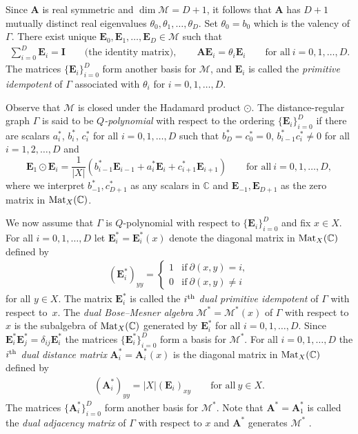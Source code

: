 \documentclass[pdftex]{sigma}%
\def\A{\mathbf A}
\def\E{\mathbf E}
\def\C{\mathbb C}
\def\I{\mathbf I}
\def\Mat{{\rm Mat}}
\def\M{\mathcal M}
\numberwithin{equation}{section}
\begin{document}
Since $\A$ is real symmetric and $\dim \M=D+1$, it follows that $\A$ has $D+1$ mutually distinct real eigenvalues $\theta_0,\theta_1,\dots,\theta_D$. Set $\theta_0=b_0$ which is the valency of $\Gamma$.
There exist unique $\E_0,\E_1,\dots,\E_D\in \M$ such that
\begin{gather*}
\sum_{i=0}^D \E_i=\I\qquad \text{(the identity matrix)},
\qquad
\A \E_i=\theta_i \E_i\qquad
\text{for all}\ i=0,1,\dots,D.
\end{gather*}
The matrices $\{\E_i\}_{i=0}^D$ form another basis for $\M$, and $\E_i$ is called the {\it primitive idempotent} of $\Gamma$ associated with $\theta_i$ for $i=0,1,\dots,D$.

Observe that $\M$ is closed under the Hadamard product $\odot$. The distance-regular graph $\Gamma$ is said to be {\it $Q$-polynomial} with respect to the ordering $\{\E_i\}_{i=0}^D$ if there are scalars $a_i^*$, $b_i^*$, $c_i^*$ for all $i=0,1,\dots,D$ such that $b_D^*=c_0^*=0$, $b_{i-1}^*c_i^*\not=0$ for all $i=1,2,\dots,D$ and{\samepage
\[
\E_1\odot \E_i=\frac{1}{|X|}
(b_{i-1}^* \E_{i-1}+a_i^* \E_i+ c_{i+1}^* \E_{i+1})\qquad
\text{for all}\ i=0,1,\dots,D,
\]
where we interpret $b_{-1}^*, c_{D+1}^*$ as any scalars in $\C$ and $\E_{-1},\E_{D+1}$ as the zero matrix in $\Mat_X(\C)$.}

We now assume that $\Gamma$ is $Q$-polynomial with respect to $\{\E_i\}_{i=0}^D$ and fix $x\in X$. For all $i=0,1,\dots,D$ let $\E_i^*=\E_i^*(x)$ denote the diagonal matrix in $\Mat_X(\C)$ defined by
\begin{gather}\label{e:Ei*}
(\E_i^*)_{yy}=
\begin{cases}
1 &\text{if}\ \partial(x,y)=i,
\\
0 &\text{if}\ \partial(x,y)\not=i
\end{cases}
\end{gather}
for all $y\in X$. The matrix $\E_i^*$ is called the {\it $i^{\rm th}$ dual primitive idempotent} of $\Gamma$ with respect to~$x$. The {\it dual Bose--Mesner algebra} $\M^*=\M^*(x)$ of $\Gamma$ with respect to $x$ is the subalgebra of $\Mat_X(\C)$ generated by $\E_i^*$ for all $i=0,1,\dots,D$. Since $\E_i^*\E_j^*=\delta_{ij} \E_i^*$ the matrices $\{\E_i^*\}_{i=0}^D$ form a basis for $\M^*$. For all $i=0,1,\dots,D$ the {\it $i^{\rm th}$ dual distance matrix} $\A_i^*=\A_i^*(x)$ is the diagonal matrix in $\Mat_X(\C)$ defined by
\begin{gather}\label{e:Ai*}
(\A_i^*)_{yy}=|X| (\E_i)_{xy}\qquad
\text{for all}\ y\in X.
\end{gather}
The matrices $\{\A_i^*\}_{i=0}^D$ form another basis for $\M^*$. Note that $\A^*=\A_1^*$ is called the {\it dual adjacency matrix} of $\Gamma$ with respect to $x$ and $\A^*$ generates $\M^*$ \cite[Lemma~3.11]{TerAlgebraI}.
\end{document}
